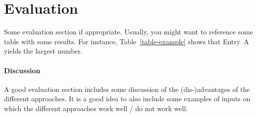 \section{Evaluation} \label{evaluation}

Some evaluation section if appropriate. Usually, you might want to reference some table with some results. For instance, Table~\ref{table-example} shows that Entry~A yields the largest number.



\paragraph{Discussion} A good evaluation section includes some discussion of the (dis-)advantages of the different approaches. It is a good idea to also include some examples of inputs on which the different approaches work well / do not work well.
